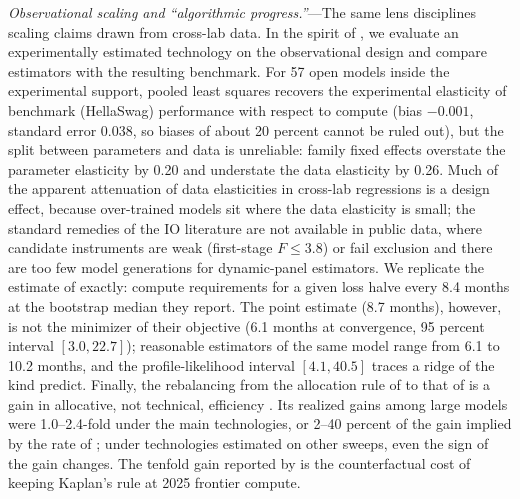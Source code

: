 \textit{Observational scaling and ``algorithmic progress.''}---The same lens disciplines scaling claims drawn from
cross-lab data. In the spirit of \citet{lalonde1986evaluating}, we evaluate an experimentally estimated technology on
the observational design and compare estimators with the resulting benchmark. For 57 open models inside the
experimental support, pooled least squares recovers the experimental elasticity of benchmark (HellaSwag)
performance with respect to compute (bias $-0.001$, standard error 0.038, so biases of about 20 percent cannot be
ruled out), but the split between parameters and data is unreliable:
family fixed effects overstate the parameter elasticity by 0.20 and understate the data elasticity by 0.26. Much of
the apparent attenuation of data elasticities in cross-lab regressions is a design effect, because over-trained
models sit where the data elasticity is small; the standard remedies of the IO literature are not available in
public data, where candidate instruments are weak (first-stage $F \le 3.8$) or fail exclusion and there are too few
model generations for dynamic-panel estimators. We
replicate the estimate of \citet{ho2024algorithmic} exactly: compute requirements for a given loss halve every 8.4
months at the bootstrap median they report. The point estimate (8.7 months), however, is not the minimizer of their
objective (6.1 months at convergence, 95 percent interval $[3.0, 22.7]$); reasonable estimators of the same model
range from 6.1 to 10.2 months, and the profile-likelihood interval $[4.1, 40.5]$ traces a ridge of the kind
\citet{diamond1978measurement} predict. Finally, the rebalancing from the allocation rule of
\citet{kaplan2020scaling} to that of \citet{hoffmann2022training} is a gain in allocative, not technical, efficiency
\citep{farrell1957measurement}. Its realized gains among large models were 1.0--2.4-fold under the main
technologies, or 2--40 percent of the gain implied by the rate of \citet{ho2024algorithmic}; under technologies
estimated on other sweeps, even the sign of the gain changes. The tenfold gain reported by \citet{gundlach2025origin} is the counterfactual cost of
keeping Kaplan's rule at 2025 frontier compute.

